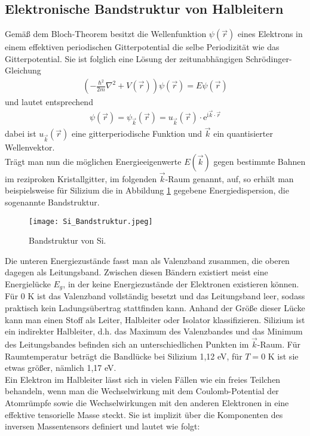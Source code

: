\subsection{Elektronische Bandstruktur von Halbleitern}
Gemäß dem Bloch-Theorem besitzt die Wellenfunktion $\psi(\vec{r})$ eines Elektrons in einem effektiven periodischen Gitterpotential die selbe Periodizität wie das Gitterpotential. Sie ist folglich eine Lösung der zeitunabhängigen Schrödinger-Gleichung
\begin{align}
\left(-\frac{\hbar^2}{2m}\nabla^2+V(\vec{r})\right)\psi(\vec{r})=E\psi(\vec{r})
\end{align}
und lautet entsprechend
\begin{align}
\psi(\vec{r})=\psi_{\vec{k}}(\vec{r})=u_{\vec{k}}(\vec{r})\cdot \mathrm{e}^{\mathrm{i}\vec{k}\cdot \vec{r}}
\end{align}
dabei ist $u_{\vec{k}}(\vec{r})$ eine gitterperiodische Funktion und $\vec{k}$ ein quantisierter Wellenvektor.\\
Trägt man nun die möglichen Energieeigenwerte $E(\vec{k})$ gegen bestimmte Bahnen im reziproken Kristallgitter, im folgenden $\vec{k}$-Raum genannt, auf, so erhält man beispielsweise für Silizium die in Abbildung \ref{fig:Si_bandstructure} gegebene Energiedispersion, die sogenannte Bandstruktur.
\begin{figure}[h]
\begin{center}
\texttt{[image: Si\_Bandstruktur.jpeg]}
\caption{Bandstruktur von Si. \cite{lit:Iba09}}
\label{fig:Si_bandstructure}
\end{center}
\end{figure}
Die unteren Energiezustände fasst man als Valenzband zusammen, die oberen dagegen als Leitungsband. Zwischen diesen Bändern existiert meist eine Energielücke $E_g$, in der keine Energiezustände der Elektronen existieren können. 
Für 0 K ist das Valenzband vollständig besetzt und das Leitungsband leer, sodass praktisch kein Ladungsübertrag stattfinden kann. 
Anhand der Größe dieser Lücke kann man einen Stoff als Leiter, Halbleiter oder Isolator klassifizieren. Silizium ist ein indirekter Halbleiter, d.h. das Maximum des Valenzbandes und das Minimum des Leitungsbandes befinden sich an unterschiedlichen Punkten im $\vec{k}$-Raum. Für Raumtemperatur beträgt die Bandlücke bei Silizium 1,12 eV, für $T=0$ K ist sie etwas größer, nämlich 1,17 eV.\\
Ein Elektron im Halbleiter lässt sich in vielen Fällen wie ein freies Teilchen behandeln, wenn man die Wechselwirkung mit dem Coulomb-Potential der Atomrümpfe sowie die Wechselwirkungen mit den anderen Elektronen in eine effektive tensorielle Masse steckt. Sie ist implizit über die Komponenten des inversen Massentensors definiert und lautet wie folgt:
